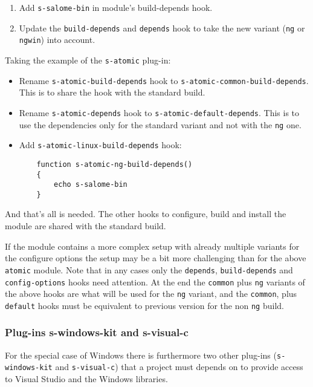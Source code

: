 \documentclass[a4paper,12pt,twoside]{article}
\newcommand{\code}[1]{\texttt{#1}}
\begin{document}
\begin{enumerate}
	\item Add \code{s-salome-bin} in module's build-depends hook.
	\item Update the \code{build-depends} and \code{depends} hook to take the new variant (\code{ng} or \code{ngwin}) into account.
\end{enumerate}

Taking the example of the \code{s-atomic} plug-in:

\begin{itemize}
	\item Rename \code{s-atomic-build-depends} hook to \code{s-atomic-common-build-depends}. This is to share the hook with the standard build.

	\item Rename \code{s-atomic-depends} hook to \code{s-atomic-default-depends}. This is to use the dependencies only for the standard variant and not with the \code{ng} one.

	\item Add \code{s-atomic-linux-build-depends} hook:
	\begin{lstlisting}
	function s-atomic-ng-build-depends()
	{
		echo s-salome-bin
	}
	\end{lstlisting}
\end{itemize}

And that's all is needed. The other hooks to configure, build and install the module are shared with the standard build.

If the module contains a more complex setup with already multiple variants for the configure options the setup may be a bit more challenging than for the above \code{atomic} module. Note that in any cases only the \code{depends}, \code{build-depends} and \code{config-options} hooks need attention. At the end the \code{common} plus \code{ng} variants of the above hooks are what will be used for the \code{ng} variant, and the \code{common}, plus \code{default} hooks must be equivalent to previous version for the non \code{ng} build.

\subsubsection{Plug-ins s-windows-kit and s-visual-c}
\label{pg:win}

For the special case of Windows there is furthermore two other plug-ins (\code{s-windows-kit} and \code{s-visual-c}) that a project must depends on to provide access to Visual Studio and the Windows libraries.
\end{document}
